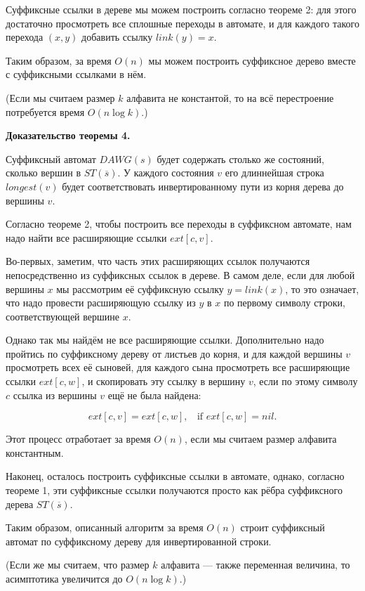 Суффиксные ссылки в дереве мы можем построить согласно теореме 2: для этого достаточно просмотреть все сплошные переходы в автомате, и для каждого такого перехода $(x,y)$ добавить ссылку $link(y) = x$.

Таким образом, за время $O(n)$ мы можем построить суффиксное дерево вместе с суффиксными ссылками в нём.

(Если мы считаем размер $k$ алфавита не константой, то на всё перестроение потребуется время $O (n \log k)$.)

\bf{Доказательство теоремы 4}.

Суффиксный автомат $DAWG(s)$ будет содержать столько же состояний, сколько вершин в $ST(\overline{s})$. У каждого состояния $v$ его длиннейшая строка $longest(v)$ будет соответствовать инвертированному пути из корня дерева до вершины $v$.

Согласно теореме 2, чтобы построить все переходы в суффиксном автомате, нам надо найти все расширяющие ссылки $ext[c,v]$.

Во-первых, заметим, что часть этих расширяющих ссылок получаются непосредственно из суффиксных ссылок в дереве. В самом деле, если для любой вершины $x$ мы рассмотрим её суффиксную ссылку $y = link(x)$, то это означает, что надо провести расширяющую ссылку из $y$ в $x$ по первому символу строки, соответствующей вершине $x$.

Однако так мы найдём не все расширяющие ссылки. Дополнительно надо пройтись по суффиксному дереву от листьев до корня, и для каждой вершины $v$ просмотреть всех её сыновей, для каждого сына просмотреть все расширяющие ссылки $ext[c,w]$, и скопировать эту ссылку в вершину $v$, если по этому символу $c$ ссылка из вершины $v$ ещё не была найдена:

$$ ext[c,v] = ext[c,w], ~~~~ \text{if $ext[c,w] = nil$.} $$

Этот процесс отработает за время $O (n)$, если мы считаем размер алфавита константным.

Наконец, осталось построить суффиксные ссылки в автомате, однако, согласно теореме 1, эти суффиксные ссылки получаются просто как рёбра суффиксного дерева $ST(\overline{s})$.

Таким образом, описанный алгоритм за время $O(n)$ строит суффиксный автомат по суффиксному дереву для инвертированной строки.

(Если же мы считаем, что размер $k$ алфавита --- также переменная величина, то асимптотика увеличится до $O (n \log k)$.)



